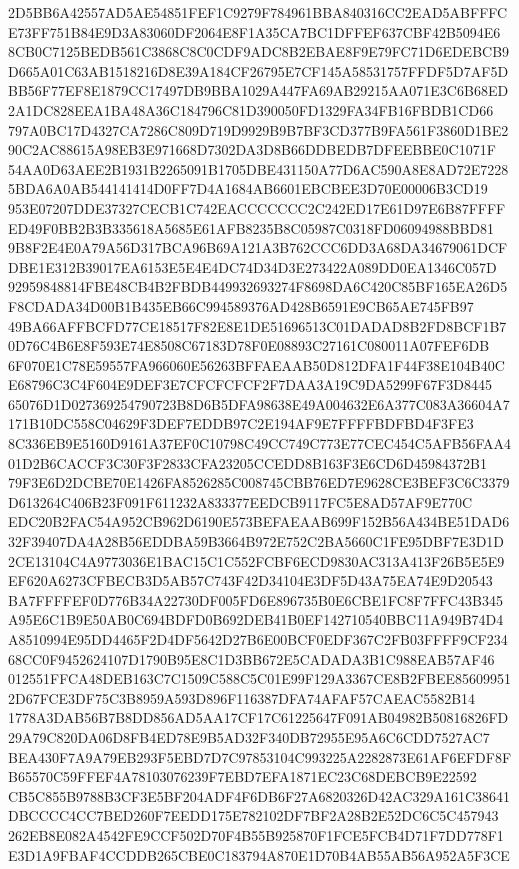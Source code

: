 \documentclass[UTF8,fontset=fandol,zihao=-4,a4paper]{ctexart}
\begin{document}
{{2D5BB6A42557AD5AE54851FEF1C9279F784961BBA840316CC2EAD5ABFFFCE73FF751B84E9D3A83060DF2064E8F1A35CA7BC1DFFEF637CBF42B5094E6
8CB0C7125BEDB561C3868C8C0CDF9ADC8B2EBAE8F9E79FC71D6EDEBCB9D665A01C63AB1518216D8E39A184CF26795E7CF145A58531757FFDF5D7AF5D
BB56F77EF8E1879CC17497DB9BBA1029A447FA69AB29215AA071E3C6B68ED2A1DC828EEA1BA48A36C184796C81D390050FD1329FA34FB16FBDB1CD66
797A0BC17D4327CA7286C809D719D9929B9B7BF3CD377B9FA561F3860D1BE290C2AC88615A98EB3E971668D7302DA3D8B66DDBEDB7DFEEBBE0C1071F
54AA0D63AEE2B1931B2265091B1705DBE431150A77D6AC590A8E8AD72E72285BDA6A0AB544141414D0FF7D4A1684AB6601EBCBEE3D70E00006B3CD19
953E07207DDE37327CECB1C742EACCCCCCC2C242ED17E61D97E6B87FFFFED49F0BB2B3B335618A5685E61AFB8235B8C05987C0318FD06094988BBD81
9B8F2E4E0A79A56D317BCA96B69A121A3B762CCC6DD3A68DA34679061DCFDBE1E312B39017EA6153E5E4E4DC74D34D3E273422A089DD0EA1346C057D
92959848814FBE48CB4B2FBDB449932693274F8698DA6C420C85BF165EA26D5F8CDADA34D00B1B435EB66C994589376AD428B6591E9CB65AE745FB97
49BA66AFFBCFD77CE18517F82E8E1DE51696513C01DADAD8B2FD8BCF1B70D76C4B6E8F593E74E8508C67183D78F0E08893C27161C080011A07FEF6DB
6F070E1C78E59557FA966060E56263BFFAEAAB50D812DFA1F44F38E104B40CE68796C3C4F604E9DEF3E7CFCFCFCF2F7DAA3A19C9DA5299F67F3D8445
65076D1D027369254790723B8D6B5DFA98638E49A004632E6A377C083A36604A7171B10DC558C04629F3DEF7EDDB97C2E194AF9E7FFFFBDFBD4F3FE3
8C336EB9E5160D9161A37EF0C10798C49CC749C773E77CEC454C5AFB56FAA401D2B6CACCF3C30F3F2833CFA23205CCEDD8B163F3E6CD6D45984372B1
79F3E6D2DCBE70E1426FA8526285C008745CBB76ED7E9628CE3BEF3C6C3379D613264C406B23F091F611232A833377EEDCB9117FC5E8AD57AF9E770C
EDC20B2FAC54A952CB962D6190E573BEFAEAAB699F152B56A434BE51DAD632F39407DA4A28B56EDDBA59B3664B972E752C2BA5660C1FE95DBF7E3D1D
2CE13104C4A9773036E1BAC15C1C552FCBF6ECD9830AC313A413F26B5E5E9EF620A6273CFBECB3D5AB57C743F42D34104E3DF5D43A75EA74E9D20543
BA7FFFFEF0D776B34A22730DF005FD6E896735B0E6CBE1FC8F7FFC43B345A95E6C1B9E50AB0C694BDFD0B692DEB41B0EF142710540BBC11A949B74D4
A8510994E95DD4465F2D4DF5642D27B6E00BCF0EDF367C2FB03FFFF9CF23468CC0F9452624107D1790B95E8C1D3BB672E5CADADA3B1C988EAB57AF46
012551FFCA48DEB163C7C1509C588C5C01E99F129A3367CE8B2FBEE856099512D67FCE3DF75C3B8959A593D896F116387DFA74AFAF57CAEAC5582B14
1778A3DAB56B7B8DD856AD5AA17CF17C61225647F091AB04982B50816826FD29A79C820DA06D8FB4ED78E9B5AD32F340DB72955E95A6C6CDD7527AC7
BEA430F7A9A79EB293F5EBD7D7C97853104C993225A2282873E61AF6EFDF8FB65570C59FFEF4A78103076239F7EBD7EFA1871EC23C68DEBCB9E22592
CB5C855B9788B3CF3E5BF204ADF4F6DB6F27A6820326D42AC329A161C38641DBCCCC4CC7BED260F7EEDD175E782102DF7BF2A28B2E52DC6C5C457943
262EB8E082A4542FE9CCF502D70F4B55B925870F1FCE5FCB4D71F7DD778F1E3D1A9FBAF4CCDDB265CBE0C183794A870E1D70B4AB55AB56A952A5F3CE
}}
\end{document}
